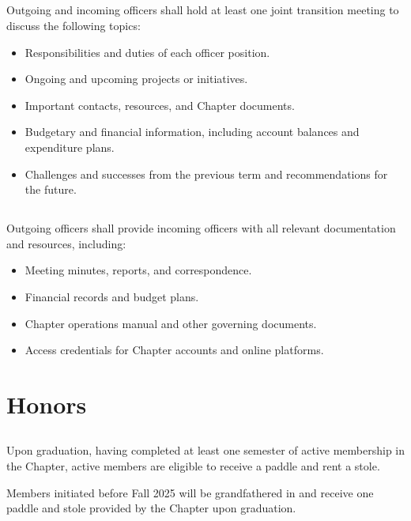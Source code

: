 \documentclass[10pt, oneside]{article}
\begin{document}
\subsection{}
Outgoing and incoming officers shall hold at least one joint transition meeting to discuss the following topics:
\begin{itemize}
    \item Responsibilities and duties of each officer position.
    \item Ongoing and upcoming projects or initiatives.
    \item Important contacts, resources, and Chapter documents.
    \item Budgetary and financial information, including account balances and expenditure plans.
    \item Challenges and successes from the previous term and recommendations for the future.
\end{itemize}

\subsection{}
Outgoing officers shall provide incoming officers with all relevant documentation and resources, including:
\begin{itemize}
    \item Meeting minutes, reports, and correspondence.
    \item Financial records and budget plans.
    \item Chapter operations manual and other governing documents.
    \item Access credentials for Chapter accounts and online platforms.
\end{itemize}



\section{Honors}
\subsection{}
Upon graduation, having completed at least one semester of active membership in the Chapter, active members are eligible to receive a paddle and rent a stole.

Members initiated before Fall 2025 will be grandfathered in and receive one paddle and stole provided by the Chapter upon graduation.
\end{document}
